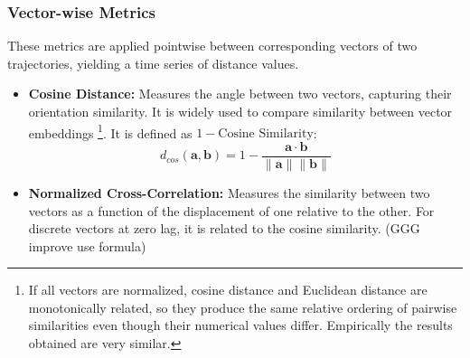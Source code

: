 \documentclass[a4paper,12pt]{article}
\begin{document}
\subsubsection{Vector-wise Metrics}
\label{sssec:methods_vector_metrics}
These metrics are applied pointwise between corresponding vectors of two trajectories, yielding a time series of distance values.
\begin{itemize}
    \item \textbf{Cosine Distance:} Measures the angle between two vectors, capturing their orientation similarity. It is widely used to compare similarity between vector embeddings \footnote{If all vectors are normalized, cosine distance and Euclidean distance are monotonically related, so they produce the same relative ordering of pairwise similarities even though their numerical values differ. Empirically the results obtained are very similar.}. It is defined as $1 - \text{Cosine Similarity}$:
    \begin{equation}
        d_{cos}(\mathbf{a}, \mathbf{b}) = 1 - \frac{\mathbf{a} \cdot \mathbf{b}}{\|\mathbf{a}\| \|\mathbf{b}\|}
    \end{equation}
    \item \textbf{Normalized Cross-Correlation:} Measures the similarity between two vectors as a function of the displacement of one relative to the other. For discrete vectors at zero lag, it is related to the cosine similarity. (GGG improve use formula)
\end{itemize}
\end{document}
